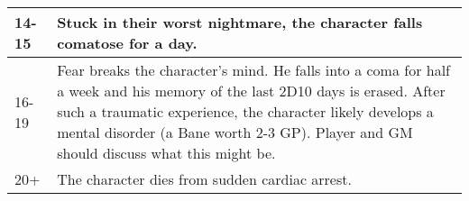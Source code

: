 \begin{tabularx}{\textwidth}{|l|X|}
	14-15  & Stuck in their worst nightmare, the character falls comatose for a day.                                                                                                                                                                                                                                                                                                           \\ \hline
	16-19  & Fear breaks the character’s mind. He falls into a coma for half a week and his memory of the last 2D10 days is erased. After such a traumatic experience, the character likely develops a mental disorder (a Bane worth 2-3 GP). Player and GM should discuss what this might be.                                                                                                    \\ \hline
	20+    & The character dies from sudden cardiac arrest.                                                                                                                                                                                                                                                                                                                                       \\ \hline
\end{tabularx}
